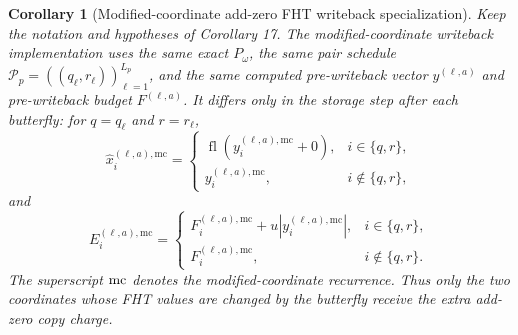 \documentclass[11pt]{article}
\newcommand{\fl}{\operatorname{fl}}
\newtheorem{corollary}[theorem]{Corollary}
\theoremstyle{remark}
\begin{document}
\begin{corollary}[Modified-coordinate add-zero FHT writeback specialization]
Keep the notation and hypotheses of Corollary 17.  The modified-coordinate
writeback implementation uses the same exact \(P_\omega\), the same pair
schedule \(\mathcal P_p=((q_\ell,r_\ell))_{\ell=1}^{L_p}\), and the same
computed pre-writeback vector \(y^{(\ell,a)}\) and pre-writeback budget
\(F^{(\ell,a)}\).  It differs only in the storage step after each butterfly:
for \(q=q_\ell\) and \(r=r_\ell\),
\[
  \widehat x_i^{(\ell,a),\mathrm{mc}}
  =
  \begin{cases}
    \fl(y_i^{(\ell,a),\mathrm{mc}}+0),& i\in\{q,r\},\\
    y_i^{(\ell,a),\mathrm{mc}},& i\notin\{q,r\},
  \end{cases}
\]
and
\[
  E_i^{(\ell,a),\mathrm{mc}}
  =
  \begin{cases}
    F_i^{(\ell,a),\mathrm{mc}}+u|y_i^{(\ell,a),\mathrm{mc}}|,
      & i\in\{q,r\},\\
    F_i^{(\ell,a),\mathrm{mc}},& i\notin\{q,r\}.
  \end{cases}
\]
The superscript \({\rm mc}\) denotes the modified-coordinate recurrence.  Thus
only the two coordinates whose FHT values are changed by the butterfly receive
the extra add-zero copy charge.


\end{corollary}
\end{document}
